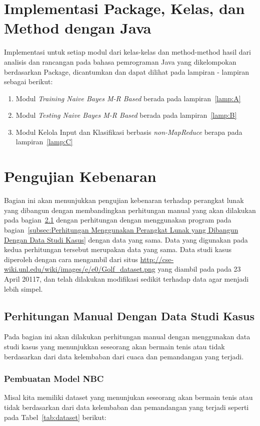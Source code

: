 \section{Implementasi Package, Kelas, dan Method dengan Java}
\label{sec:impl_code}

Implementasi untuk setiap modul dari kelas-kelas dan method-method hasil dari analisis dan rancangan pada bahasa pemrograman Java yang dikelompokan berdasarkan Package, dicantumkan dan dapat dilihat pada lampiran - lampiran sebagai berikut:
\begin{enumerate}
	\item Modul \textit{Training Naive Bayes M-R Based} berada pada lampiran~\ref{lamp:A}
	\item Modul \textit{Testing Naive Bayes M-R Based} berada pada lampiran~\ref{lamp:B}
	\item Modul Kelola Input dan Klasifikasi berbasis \textit{non-MapReduce} berapa pada lampiran~\ref{lamp:C}
\end{enumerate}

\section{Pengujian Kebenaran}
Bagian ini akan menunjukkan pengujian kebenaran terhadap perangkat lunak yang dibangun dengan membandingkan perhitungan manual yang akan dilakukan pada bagian~\ref{subsec:Perhitungan Manual Dengan Data Studi Kasus} dengan perhitungan dengan menggunakan program pada bagian~\ref{subsec:Perhitungan Menggunakan Perangkat Lunak yang Dibangun Dengan Data Studi Kasus} dengan data yang sama. Data yang digunakan pada kedua perhitungan tersebut merupakan data yang sama. Data studi kasus diperoleh dengan cara mengambil dari situs \url{http://cse-wiki.unl.edu/wiki/images/e/e0/Golf_dataset.png} yang diambil pada pada 23 April 20117, dan telah dilakukan modifikasi sedikit terhadap data agar menjadi lebih simpel.

\subsection{Perhitungan Manual Dengan Data Studi Kasus}
\label{subsec:Perhitungan Manual Dengan Data Studi Kasus}
Pada bagian ini akan dilakukan perhitungan manual dengan menggunakan data studi kasus yang menunjukkan seseorang akan bermain tenis atau tidak berdasarkan dari data kelembaban dari cuaca dan pemandangan yang terjadi.

\subsubsection{Pembuatan Model NBC}
Misal kita memiliki dataset yang menunjukan seseorang akan bermain tenis atau tidak berdasarkan dari data kelembaban dan pemandangan yang terjadi seperti pada Tabel~\ref{tab:dataset} berikut: 
		
